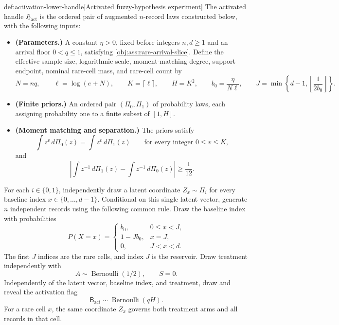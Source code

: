 \begin{algorithmv}{def:activation-lower-handle}[Activated fuzzy-hypothesis experiment]
The activated handle \(\mathfrak H_{\mathrm{act}}\) is the ordered pair of augmented \(n\)-record laws constructed below, with the following inputs:
\begin{itemize}
\item \textbf{(Parameters.)} A constant \(\eta>0\), fixed before integers \(n,d\ge1\) and an arrival floor \(0<q\le1\), satisfying \cref{obj:ass:rare-arrival-slice}. Define the effective sample size, logarithmic scale, moment-matching degree, support endpoint, nominal rare-cell mass, and rare-cell count by
\[
N=nq,\qquad
\ell=\log(e+N),\qquad
K=\lceil\ell\rceil,\qquad
H=K^2,\qquad
b_0=\frac{\eta}{N\ell},\qquad
J=\min\left\{d-1,\left\lfloor\frac{1}{2b_0}\right\rfloor\right\}.
\]
\item \textbf{(Finite priors.)} An ordered pair \((\Pi_0,\Pi_1)\) of probability laws, each assigning probability one to a finite subset of \([1,H]\).
\item \textbf{(Moment matching and separation.)} The priors satisfy
\[
\int z^v\,d\Pi_0(z)=\int z^v\,d\Pi_1(z)
\qquad\text{for every integer }0\le v\le K,
\]
and
\[
\left|\int z^{-1}\,d\Pi_1(z)-\int z^{-1}\,d\Pi_0(z)\right|
\ge\frac1{12}.
\]
\end{itemize}

For each \(i\in\{0,1\}\), independently draw a latent coordinate \(Z_x\sim\Pi_i\) for every baseline index \(x\in\{0,\ldots,d-1\}\). Conditional on this single latent vector, generate \(n\) independent records using the following common rule. Draw the baseline index with probabilities
\[
P(X=x)=
\begin{cases}
b_0,&0\le x<J,\\
1-Jb_0,&x=J,\\
0,&J<x<d.
\end{cases}
\]
The first \(J\) indices are the rare cells, and index \(J\) is the reservoir. Draw treatment independently with
\[
A\sim\operatorname{Bernoulli}(1/2),
\qquad S=0.
\]
Independently of the latent vector, baseline index, and treatment, draw and reveal the activation flag
\[
\mathsf B_{\mathrm{act}}\sim\operatorname{Bernoulli}(qH).
\]
For a rare cell \(x\), the same coordinate \(Z_x\) governs both treatment arms and all records in that cell.


\end{algorithmv}
